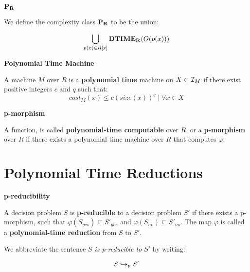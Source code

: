 \begin{definition}{$\mathbf{P_R}$}

  We define the complexity class $\mathbf{P_R}$ to be the union:

  $$\bigcup_{p(x) \in R[x]}\mathbf{DTIME_R}(O(p(x)))$$

\end{definition}

\begin{example}
\end{example}

\begin{definition}{\textbf{Polynomial Time Machine}}

  A machine $M$ over $R$ is a \textbf{polynomial time} machine on $X
  \subset \mathcal{I}_M$ if there exist positive integers $c$ and $q$
  such that:
  $$cost_M(x) \leq c(size(x))^q \mid \forall x \in X$$
\end{definition}

\begin{definition}{\textbf{p-morphism}}
  
  A function,  is called
  \textbf{polynomial-time computable} over $R$, or a
  \textbf{p-morphism} over $R$ if there exists a polynomial time
  machine over $R$ that computes $\varphi$.

\end{definition}

\section{Polynomial Time Reductions}

\begin{definition}{\textbf{p-reducibility}}

  A decision problem $S$ is \textbf{p-reducible} to a decision problem
  $S'$ if there exists a p-morphism,
   such that $\varphi(S_{yes})
  \subseteq S'_{yes}$ and $\varphi(S_{no}) \subseteq S'_{no}$.  The
  map $\varphi$ is called a \textbf{polynomial-time reduction} from
  $S$ to $S'$.

  We abbreviate the sentence \emph{$S$ is p-reducible to $S'$} by writing:

  $$S \hookrightarrow_p S'$$
  \end{definition}


